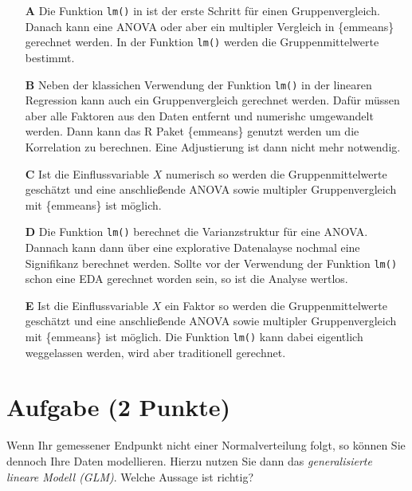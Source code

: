\documentclass[a4paper, 9pt]{scrartcl}\usepackage[]{graphicx}\usepackage[]{xcolor}
\begin{document}
\begin{enumerate}
\item [\textbf{A} \msquare] Die Funktion \texttt{lm()} in \Rlogo ist der erste Schritt für einen Gruppenvergleich. Danach kann eine ANOVA oder aber ein multipler Vergleich in \{emmeans\} gerechnet werden. In der Funktion  \texttt{lm()} werden die Gruppenmittelwerte bestimmt.
\item [\textbf{B} \msquare] Neben der klassichen Verwendung der Funktion \texttt{lm()} in der linearen Regression kann auch ein Gruppenvergleich gerechnet werden. Dafür müssen aber alle Faktoren aus den Daten entfernt und numerishc umgewandelt werden. Dann kann das R Paket \{emmeans\} genutzt werden um die Korrelation zu berechnen. Eine Adjustierung ist dann nicht mehr notwendig.
\item [\textbf{C} \msquare] Ist die Einflussvariable $X$ numerisch so werden die Gruppenmittelwerte geschätzt und eine anschließende ANOVA sowie multipler Gruppenvergleich mit \{emmeans\} ist möglich.
\item [\textbf{D} \msquare] Die Funktion \texttt{lm()} berechnet die Varianzstruktur für eine ANOVA. Dannach kann dann über eine explorative Datenalayse nochmal eine Signifikanz berechnet werden. Sollte vor der Verwendung der Funktion \texttt{lm()} schon eine EDA gerechnet worden sein, so ist die Analyse wertlos.
\item [\textbf{E} \msquare] Ist die Einflussvariable $X$ ein Faktor so werden die Gruppenmittelwerte geschätzt und eine anschließende ANOVA sowie multipler Gruppenvergleich mit \{emmeans\} ist möglich. Die Funktion \texttt{lm()} kann dabei eigentlich weggelassen werden, wird aber traditionell gerechnet.
\end{enumerate}

\section{Aufgabe \hfill (2 Punkte)}

\ifcollection
\begin{flushright}
\tiny\vspace{-2Ex}
\textbf{\examinhaltstart}
\exammodulebiostat
\vspace{-1Ex}
\end{flushright}
\fi




Wenn Ihr gemessener Endpunkt nicht einer Normalverteilung folgt, so können Sie dennoch Ihre Daten modellieren. Hierzu nutzen Sie dann das \textit{generalisierte lineare Modell (GLM)}. Welche Aussage ist richtig?
\end{document}
